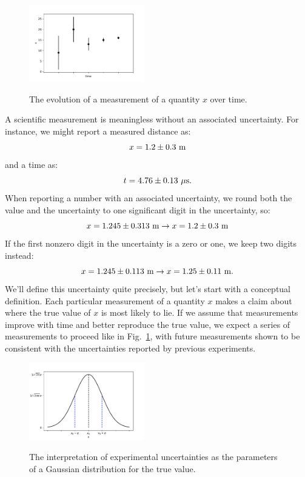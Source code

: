 \documentclass[12pt,oneside]{book}
\begin{document}
\begin{figure}[htbp]
\begin{center}
{\includegraphics[width=0.45\textwidth]{figs/measuretime.pdf}}
\end{center}
\caption{\label{fig:measuretime}  The evolution of a measurement of a quantity $x$ over time.}
\end{figure}

A scientific measurement is meaningless without an associated uncertainty.   For instance, we might report a measured distance as:
\begin{displaymath}
x = 1.2 \pm 0.3~\rm m
\end{displaymath}
and a time as:
\begin{displaymath}
t = 4.76 \pm 0.13~\rm \mu s.
\end{displaymath}
When reporting a number with an associated uncertainty, we round both the value and the uncertainty to one significant digit in the uncertainty, so:
\begin{displaymath}
x = 1.245 \pm 0.313~{\rm m} \to x = 1.2 \pm 0.3~{\rm m} 
\end{displaymath}
If the first nonzero digit in the uncertainty is a zero or one, we keep two digits instead:
\begin{displaymath}
x = 1.245 \pm 0.113~{\rm m} \to x = 1.25 \pm 0.11~{\rm m}.
\end{displaymath}
We'll define this uncertainty quite precisely, but let's start with a conceptual definition.  Each particular measurement of a quantity $x$ makes a claim about where the true value of $x$ is most likely to lie.  If we assume that measurements improve with time and better reproduce the true value, we expect a series of measurements to proceed like in Fig.~\ref{fig:measuretime}, with future measurements shown to be consistent with the uncertainties reported by previous experiments.

\begin{figure}[htbp]
\begin{center}
{\includegraphics[width=0.45\textwidth]{figs/stdunc.pdf}}
\end{center}
\caption{\label{fig:stdunc}  The interpretation of experimental uncertainties as the parameters of a Gaussian distribution for the true value.}
\end{figure}
\end{document}
